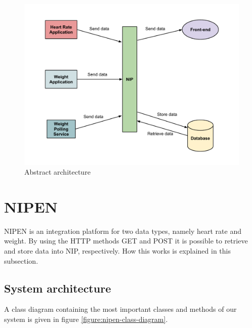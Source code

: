 \begin{figure}[h]
\centering
\includegraphics[scale=0.5]{../Figures/abstract-architecture.pdf}
\caption{Abstract architecture}
\label{figure:abstract-architecture}
\end{figure}

\section{NIPEN}

NIPEN is an integration platform for two data types, namely heart rate and weight.
By using the HTTP methods GET and POST it is possible to retrieve and store data into NIP, respectively.
How this works is explained in this subsection.

\subsection{System architecture}

A class diagram containing the most important classes and methods of our system is given in figure \ref{figure:nipen-class-diagram}.

